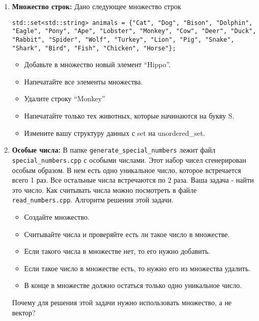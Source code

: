 \documentclass{article}
\begin{document}
\begin{enumerate}
\item \textbf{Множество строк:} Дано следующее множество строк
\begin{lstlisting}
std::set<std::string> animals = {"Cat", "Dog", "Bison", "Dolphin", "Eagle", "Pony", "Ape", "Lobster", "Monkey", "Cow", "Deer", "Duck", "Rabbit", "Spider", "Wolf", "Turkey", "Lion", "Pig", "Snake", "Shark", "Bird", "Fish", "Chicken", "Horse"};
\end{lstlisting}
\begin{itemize}
\item Добавьте в множество новый элемент ``Hippo''.
\item Напечатайте все элементы множества.
\item Удалите строку ``Monkey''
\item Напечатайте только тех животных, которые начинаются на букву S.
\item Измените вашу структуру данных с set на unordered\_set.
\end{itemize}


\item \textbf{Особые числа:} В папке \texttt{generate\_special\_numbers} лежит файл \texttt{special\_numbers.cpp} с особыми числами. Этот набор чисел сгенерирован особым образом. В нем есть одно уникальное число, которое встречается всего 1 раз. Все остальные числа встречаются по 2 раза. Ваша задача - найти это число. Как считывать числа можно посмотреть в файле \texttt{read\_numbers.cpp}. Алгоритм решения этой задачи.
\begin{itemize}
\item Создайте множество.
\item Считывайте числа и проверяйте есть ли такое число в множестве.
\item Если такого числа в множестве нет, то его нужно добавить.
\item Если такое число в множестве есть, то нужно его из множества удалить.
\item В конце в множестве должно остаться только одно уникальное число.
\end{itemize}
Почему для решения этой задачи нужно использовать множество, а не вектор?

\end{enumerate}
\fi
\end{document}
